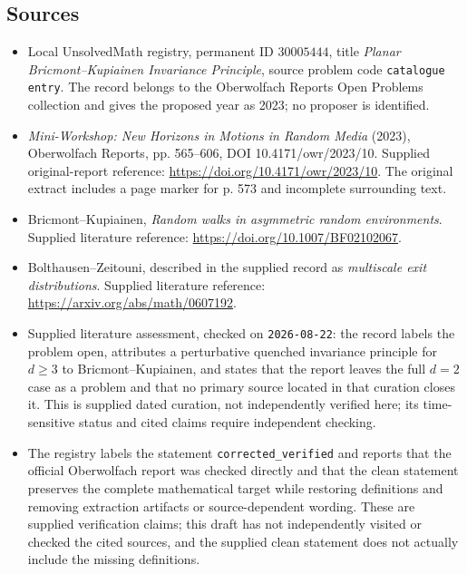 \documentclass[11pt]{article}
\begin{document}
\subsection{Sources}
\begin{itemize}
\item Local UnsolvedMath registry, permanent ID \(30005444\), title \emph{Planar Bricmont--Kupiainen Invariance Principle}, source problem code \texttt{catalogue entry}. The record belongs to the Oberwolfach Reports Open Problems collection and gives the proposed year as 2023; no proposer is identified.
\item \emph{Mini-Workshop: New Horizons in Motions in Random Media} (2023), Oberwolfach Reports, pp. 565--606, DOI 10.4171/owr/2023/10. Supplied original-report reference: \url{https://doi.org/10.4171/owr/2023/10}. The original extract includes a page marker for p. 573 and incomplete surrounding text.
\item Bricmont--Kupiainen, \emph{Random walks in asymmetric random environments}. Supplied literature reference: \url{https://doi.org/10.1007/BF02102067}.
\item Bolthausen--Zeitouni, described in the supplied record as \emph{multiscale exit distributions}. Supplied literature reference: \url{https://arxiv.org/abs/math/0607192}.
\item Supplied literature assessment, checked on \texttt{2026-08-22}: the record labels the problem open, attributes a perturbative quenched invariance principle for \(d\geq3\) to Bricmont--Kupiainen, and states that the report leaves the full \(d=2\) case as a problem and that no primary source located in that curation closes it. This is supplied dated curation, not independently verified here; its time-sensitive status and cited claims require independent checking.
\item The registry labels the statement \texttt{corrected\_verified} and reports that the official Oberwolfach report was checked directly and that the clean statement preserves the complete mathematical target while restoring definitions and removing extraction artifacts or source-dependent wording. These are supplied verification claims; this draft has not independently visited or checked the cited sources, and the supplied clean statement does not actually include the missing definitions.
\end{itemize}
\end{document}
